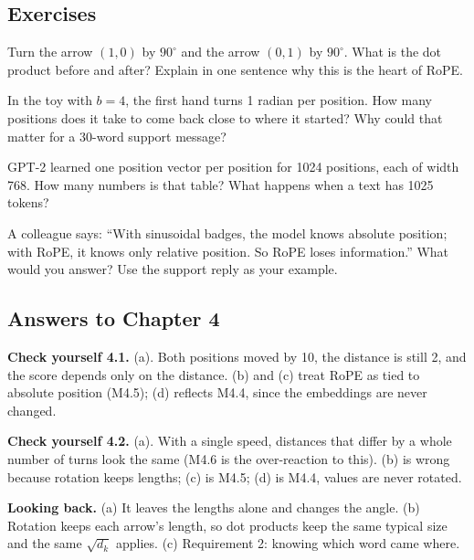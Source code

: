 \subsection*{Exercises}

\begin{exercise}
Turn the arrow $(1,0)$ by $90^\circ$ and the arrow $(0,1)$ by $90^\circ$. What is the dot product before
and after? Explain in one sentence why this is the heart of RoPE.
\end{exercise}

\begin{exercise}
In the toy with $b=4$, the first hand turns 1 radian per position. How many positions does it take to
come back close to where it started? Why could that matter for a 30-word support message?
\end{exercise}

\begin{exercise}
GPT-2 learned one position vector per position for 1024 positions, each of width 768. How many numbers
is that table? What happens when a text has 1025 tokens?
\end{exercise}

\begin{exercise}
A colleague says: ``With sinusoidal badges, the model knows absolute position; with RoPE, it knows only
relative position. So RoPE loses information.'' What would you answer? Use the support reply as your
example.
\end{exercise}

\subsection*{Answers to Chapter 4}

\noindent\textbf{Check yourself 4.1.} (a). Both positions moved by 10, the distance is still 2, and the
score depends only on the distance. (b) and (c) treat RoPE as tied to absolute position (M4.5); (d)
reflects M4.4, since the embeddings are never changed.

\noindent\textbf{Check yourself 4.2.} (a). With a single speed, distances that differ by a whole number of
turns look the same (M4.6 is the over-reaction to this). (b) is wrong because rotation keeps lengths;
(c) is M4.5; (d) is M4.4, values are never rotated.

\noindent\textbf{Looking back.} (a) It leaves the lengths alone and changes the angle. (b) Rotation keeps
each arrow's length, so dot products keep the same typical size and the same $\sqrt{d_k}$ applies.
(c) Requirement 2: knowing which word came where.

